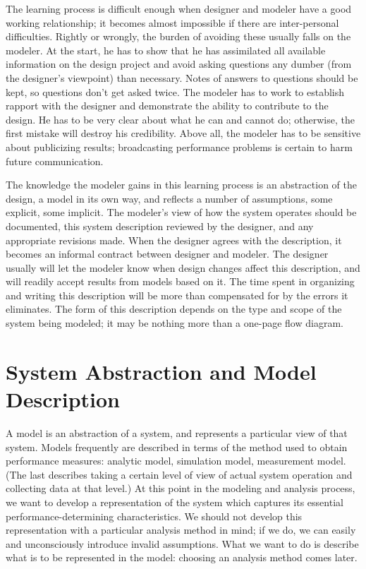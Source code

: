 The learning process is difficult enough when designer and modeler have a
good working relationship; it becomes almost impossible if there are
inter-personal difficulties. Rightly or wrongly, the burden of avoiding these
usually falls on the modeler. At the start, he has to show that he has
assimilated all available information on the design project and avoid asking
questions any dumber (from the designer's viewpoint) than necessary. Notes of
answers to questions should be kept, so questions don't get asked twice. The
modeler has to work to establish rapport with the designer and demonstrate
the ability to contribute to the design. He has to be very clear about what he
can and cannot do; otherwise, the first mistake will destroy his credibility.
Above all, the modeler has to be sensitive about publicizing results;
broadcasting performance problems is certain to harm future communication.

The knowledge the modeler gains in this learning process is an abstraction of
 the design, a model in its own way, and reflects a number of assumptions,
some explicit, some implicit. The modeler's view of how the system operates
should be documented, this system description reviewed by the designer, and
any appropriate revisions made. When the designer agrees with the
description, it becomes an informal contract between designer and modeler.
The designer usually will let the modeler know when design 
\noindent changes affect this
description, and will readily accept results from models based on it. The time
spent in organizing and writing this description will be more than compensated
for by the errors it eliminates. The form of this description depends on the
type and scope of the system being modeled; it may be nothing more than a
one-page flow diagram.

\section{System Abstraction and Model Description}
\label{sec:system-abstraction-model-description}

A model is an abstraction of a system, and represents a particular view of
that system. Models frequently are described in terms of the method used to
obtain performance measures: analytic model, simulation model, measurement
model. (The last describes taking a certain level of view of actual system
operation and collecting data at that level.) At this point in the modeling
and analysis process, we want to develop a representation of the system which
captures its essential performance-determining characteristics. We should not
develop this representation with a particular analysis method in mind; if we
do, we can easily and unconsciously introduce invalid assumptions. What we
want to do is describe what is to be represented in the model: choosing an
analysis method comes later.

